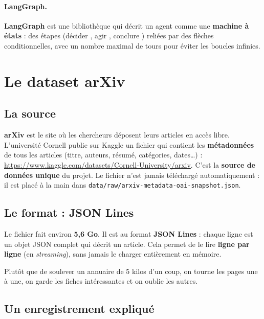 \documentclass[11pt,a4paper]{article}
\newcommand{\code}[1]{\texttt{#1}}
\begin{document}
\paragraph{LangGraph.}
\textbf{LangGraph} est une bibliothèque qui décrit un agent comme une \textbf{machine à
états} : des étapes (\og décider \fg{}, \og agir \fg{}, \og conclure \fg{}) reliées par des
flèches conditionnelles, avec un nombre maximal de tours pour éviter les boucles infinies.

\section{Le dataset arXiv}

\subsection{La source}

\textbf{arXiv} est le site où les chercheurs déposent leurs articles en accès libre.
L'université Cornell publie sur Kaggle un fichier qui contient les \textbf{métadonnées} de
tous les articles (titre, auteurs, résumé, catégories, dates\ldots) :
\url{https://www.kaggle.com/datasets/Cornell-University/arxiv}. C'est la \textbf{source de
données unique} du projet. Le fichier n'est jamais téléchargé automatiquement : il est
placé à la main dans \code{data/raw/arxiv-metadata-oai-snapshot.json}.

\subsection{Le format : JSON Lines}

Le fichier fait environ \textbf{5,6 Go}. Il est au format \textbf{JSON Lines} : chaque ligne
est un objet JSON complet qui décrit un article. Cela permet de le lire \textbf{ligne par
ligne} (en \emph{streaming}), sans jamais le charger entièrement en mémoire.

\begin{analogie}
Plutôt que de soulever un annuaire de 5 kilos d'un coup, on tourne les pages une à une, on
garde les fiches intéressantes et on oublie les autres.
\end{analogie}

\subsection{Un enregistrement expliqué}
\end{document}

